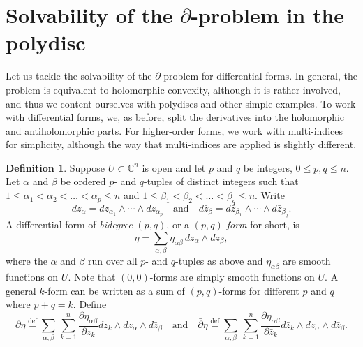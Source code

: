 \documentclass[12pt,openany]{book}
\newcommand{\C}{{\mathbb{C}}}
\newcommand{\myindex}[1]{#1\index{#1}}
\theoremstyle{plain}
\theoremstyle{remark}
\theoremstyle{definition}
\newtheorem{defn}[thm]{Definition}
\theoremstyle{exercise}
\theoremstyle{example}
\begin{document}

\section{Solvability of the \texorpdfstring{$\bar{\partial}$}{dbar}-problem in the polydisc} \label{sec:dbarpoly}

Let us tackle the solvability of the $\bar{\partial}$-problem for differential forms.
In general, the problem is equivalent to holomorphic convexity, although
it is rather involved, and thus we content ourselves with polydiscs and
other simple examples.
To work with differential forms, we, as before, split the derivatives
into the holomorphic and antiholomorphic parts.  For higher-order forms,
we work with multi-indices for simplicity, although the way that
multi-indices are applied is slightly different.

\begin{defn} \label{defn:danddbarform}
\pagebreak[2]
Suppose $U \subset \C^n$ is open and
let $p$ and $q$ be integers, $0 \leq p,q \leq n$.
Let $\alpha$ and $\beta$ be ordered $p$- and $q$-tuples of
distinct integers such that
$1 \leq \alpha_1 < \alpha_2 < \dots < \alpha_p \leq n$ and
$1 \leq \beta_1 < \beta_2 < \dots < \beta_q \leq n$.
Write
\begin{equation*}
dz_{\alpha} =
dz_{\alpha_1}
\wedge
\cdots
\wedge
dz_{\alpha_p}
\quad
\text{and}
\quad
d\bar{z}_{\beta} =
d\bar{z}_{\beta_1}
\wedge
\cdots
\wedge
d\bar{z}_{\beta_q} .
\end{equation*}
A differential form of
\emph{\myindex{bidegree}} $(p,q)$, or
a \emph{\myindex{$(p,q)$-form}} for short, is
\begin{equation*}
\eta =
\sum_{\alpha,\beta}
\eta_{\alpha \beta} \, dz_\alpha \wedge d\bar{z}_\beta ,
\end{equation*}
where the $\alpha$ and $\beta$ run over all $p$- and $q$-tuples
as above and $\eta_{\alpha \beta}$ are smooth functions on $U$.
Note that $(0,0)$-forms are simply smooth functions on $U$.
A general $k$-form can be written as a sum of $(p,q)$-forms
for different $p$ and $q$ where $p+q = k$.
Define
%
%
\begin{equation*}
\partial \eta \overset{\text{def}}{=}
\sum_{\alpha,\beta}
\,
\sum_{k=1}^n
\frac{\partial \eta_{\alpha \beta}}{\partial z_k} dz_k \wedge dz_\alpha
\wedge d\bar{z}_\beta 
\quad \text{and} \quad
\bar{\partial} \eta \overset{\text{def}}{=}
\sum_{\alpha,\beta}
\,
\sum_{k=1}^n
\frac{\partial \eta_{\alpha \beta}}{\partial \bar{z}_k} d\bar{z}_k \wedge dz_\alpha
\wedge d\bar{z}_\beta .
\end{equation*}
\end{defn}
\end{document}
